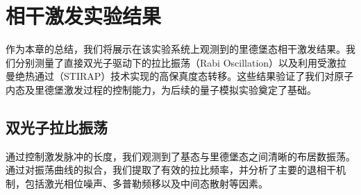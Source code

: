 \documentclass[../main.tex]{subfiles}
\begin{document}






\section{相干激发实验结果}
\label{sec:coherent_results}

作为本章的总结，我们将展示在该实验系统上观测到的里德堡态相干激发结果。我们分别测量了直接双光子驱动下的拉比振荡（Rabi Oscillation）以及利用受激拉曼绝热通过（STIRAP）技术实现的高保真度态转移。这些结果验证了我们对原子内态及里德堡激发过程的控制能力，为后续的量子模拟实验奠定了基础。

\subsection{双光子拉比振荡}
\label{ch4:sec:rabi_results}

通过控制激发脉冲的长度，我们观测到了基态与里德堡态之间清晰的布居数振荡。通过对振荡曲线的拟合，我们提取了有效的拉比频率，并分析了主要的退相干机制，包括激光相位噪声、多普勒频移以及中间态散射等因素。
\end{document}
